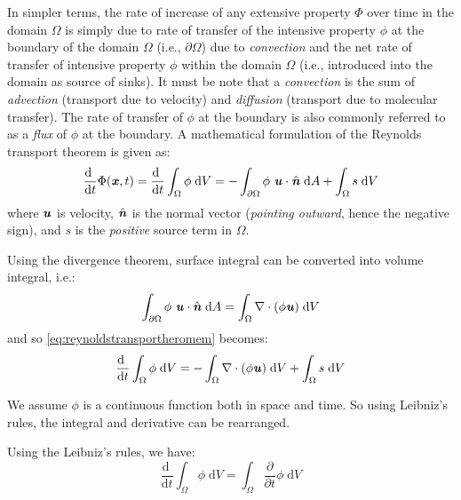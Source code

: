 In simpler terms, the rate of increase of any extensive property $\Phi$ over time in the domain $\Omega$ is simply due to rate of transfer of the intensive property $\phi$ at the boundary of the domain $\Omega$ (i.e., $\partial \Omega$) due to \textit{convection} and the net rate of transfer of intensive property $\phi$ within the domain $\Omega$ (i.e., introduced into the domain as source of sinks). It must be note that a \textit{convection} is the sum of \textit{advection} (transport due to velocity) and \textit{diffusion} (transport due to molecular transfer). The rate of transfer of $\phi$ at the boundary is also commonly referred to as a \textit{flux} of $\phi$ at the boundary. A mathematical formulation of the Reynolds transport theorem is given as:
\begin{equation}
\frac{\mathrm{d}~}{\mathrm{d}t} \Phi (\textbf{\textit{x}},t) = \frac{\mathrm{d}~}{\mathrm{d}t}\int_{\Omega} \phi\;\mathrm{d}V = -\int_{\partial\Omega} \phi~\textbf{\textit{u}}\cdot\hat{\textbf{\textit{n}}}\;\mathrm{d}A + \int_{\Omega} s\;\mathrm{d}V
\label{eq:reynoldstransportheromem}
\end{equation}
where $\textbf{\textit{u}}$ is velocity, $\hat{\textbf{\textit{n}}}$ is the normal vector (\textit{pointing outward}, hence the negative sign), and $s$ is the \textit{positive} source term in $\Omega$.

Using the divergence theorem,  surface integral can be converted into volume integral, i.e.:
\begin{equation}
\int_{\partial\Omega} \phi~\textbf{\textit{u}}\cdot\hat{\textbf{\textit{n}}}\;\mathrm{d}A = \int_{\Omega} \nabla \cdot (\phi\textbf{\textit{u}})\;\mathrm{d}V
\end{equation}
and so \ref{eq:reynoldstransportheromem} becomes:
\begin{equation}
\frac{\mathrm{d}~}{\mathrm{d}t}\int_{\Omega} \phi\;\mathrm{d}V = -\int_{\Omega} \nabla \cdot (\phi\textbf{\textit{u}})\;\mathrm{d}V + \int_{\Omega} s\;\mathrm{d}V
\label{eq:lib11}
\end{equation}

\begin{assumption}
We assume $\phi$ is a continuous function both in space and time. So using Leibniz's rules, the integral and derivative can be rearranged.
\end{assumption}

Using the Leibniz's rules, we have:
\begin{equation}
\frac{\mathrm{d}~}{\mathrm{d}t}\int_{\Omega} \phi\;\mathrm{d}V = \int_{\Omega}  \frac{\partial}{\partial t}\phi\;\mathrm{d}V
\end{equation}

